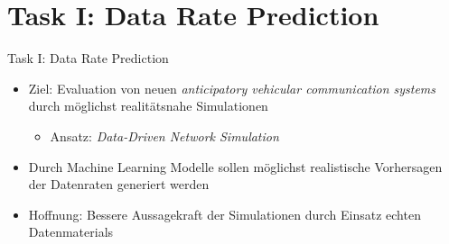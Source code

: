 \section{Task I: Data Rate Prediction}
\begin{frame}{Task I: Data Rate Prediction}
    \begin{itemize}
        \item Ziel: Evaluation von neuen \textit{anticipatory vehicular communication systems} durch m\"oglichst
            realit\"atsnahe Simulationen \cite{IEEE}
            \begin{itemize}
                \item[\Rightarrow] Ansatz: \textit{Data-Driven Network Simulation}
            \end{itemize}
        \item Durch Machine Learning Modelle sollen m\"oglichst realistische Vorhersagen der Datenraten generiert werden
        \item Hoffnung: Bessere Aussagekraft der Simulationen durch Einsatz echten Datenmaterials
    \end{itemize}
\end{frame}
